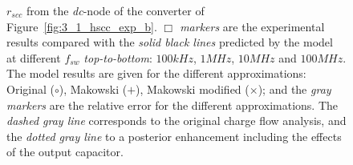 \begin{figure}[!h]
\centering
    \begin{subfigure}{\textwidth}
        \parbox[c]{.03\linewidth}{\subcaption{}\label{fig:exp_rscc_dc_node_100kHz}}
        \hspace{.02\linewidth}
        \parbox[c]{.95\linewidth}{
        \centering
        }
    \end{subfigure}

    \begin{subfigure}{\textwidth}
        \parbox[c]{.03\linewidth}{\subcaption{}\label{fig:exp_rscc_dc_node_1MHz}}
        \hspace{.02\linewidth}
        \parbox[c]{.95\linewidth}{
        \centering
        }
    \end{subfigure}

    \begin{subfigure}{\textwidth}
        \parbox[c]{.03\linewidth}{\subcaption{}\label{fig:exp_rscc_dc_node_10MHz}}
        \hspace{.02\linewidth}
        \parbox[c]{.95\linewidth}{
        \centering
        }
    \end{subfigure}

    \begin{subfigure}{\textwidth}
        \parbox[c]{.03\linewidth}{\subcaption{}\label{fig:exp_rscc_dc_node_100MHz}}
        \hspace{.02\linewidth}
        \parbox[c]{.95\linewidth}{
        \centering
        }
    \end{subfigure}

\caption{$r_{scc}$ from the \emph{dc}-node of the converter of Figure~\ref{fig:3_1_hscc_exp_b}. \emph{$\Box$ markers} are the experimental results compared with the \emph{solid black lines} predicted by the model at different $f_{sw}$ \emph{top-to-bottom}: $100kHz$, $1MHz$, $10MHz$ and $100MHz$. The model results are given for the different approximations: Original ($\circ$), Makowski ($+$), Makowski modified ($\times$); and the \emph{gray markers} are the relative error for the different approximations. The \emph{dashed gray line} corresponds to the original charge flow analysis, and the \emph{dotted gray line} to a posterior enhancement including the effects of the output capacitor.}
\label{fig:exp_rscc_dc_node_dx}
\end{figure}

